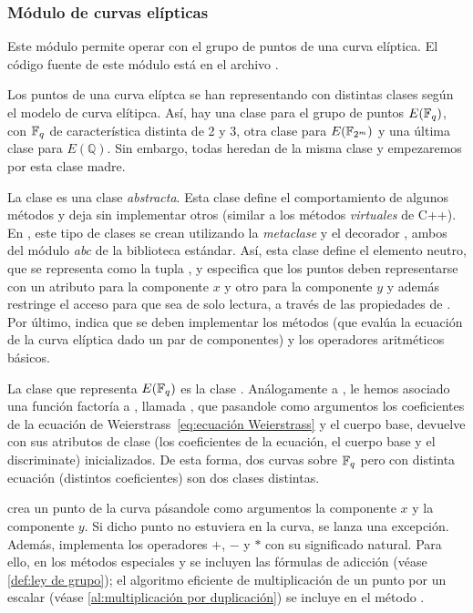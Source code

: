 \subsubsection{Módulo de curvas elípticas}
\label{subs:Módulo de curvas elípticas}

Este módulo permite operar con el grupo de puntos de una curva elíptica. El código fuente de este módulo está en el archivo .

Los puntos de una curva elíptca se han representando con distintas clases según el modelo de curva elítipca. Así, hay una clase para el grupo de puntos $E(\mathbb{F}_q)$, con $\mathbb{F}_q$ de característica distinta de 2 y 3, otra clase para $E(\mathbb{F}_{2^m})$ y una última clase para $E(\mathbb{Q})$. Sin embargo, todas heredan de la misma clase y empezaremos por esta clase madre.

La clase  es una clase \emph{abstracta}. Esta clase define el comportamiento de algunos métodos y deja sin implementar otros (similar a los métodos \emph{virtuales} de C++). En , este tipo de clases se crean utilizando la \emph{metaclase}  y el decorador , ambos del módulo \emph{abc} de la biblioteca estándar. Así, esta clase define el elemento neutro, que se representa como la tupla , y especifica que los puntos deben representarse con un atributo para la componente $x$ y otro para la componente $y$ y además restringe el acceso para que sea de solo lectura, a través de las propiedades de . Por último, indica que se deben implementar los métodos  (que evalúa la ecuación de la curva elíptica dado un par de componentes) y los operadores aritméticos básicos.

La clase que representa $E(\mathbb{F}_q)$ es la clase . Análogamente a , le hemos asociado una función factoría a , llamada , que pasandole como argumentos los coeficientes de la ecuación de Weierstrass~\ref{eq:ecuación Weierstrass} y el cuerpo base, devuelve  con sus atributos de clase (los coeficientes de la ecuación, el cuerpo base y el discriminate) inicializados. De esta forma, dos curvas sobre $\mathbb{F}_q$ pero con distinta ecuación (distintos coeficientes) son dos clases distintas.

 crea un punto de la curva pásandole como argumentos la componente $x$ y la componente $y$. Si dicho punto no estuviera en la curva, se lanza una excepción. Además,  implementa los operadores $+$, $-$ y $*$ con su significado natural. Para ello, en los métodos especiales  y  se incluyen las fórmulas de adicción (véase \ref{def:ley de grupo}); el algoritmo eficiente de multiplicación de un punto por un escalar (véase \ref{al:multiplicación por duplicación}) se incluye en el método .

